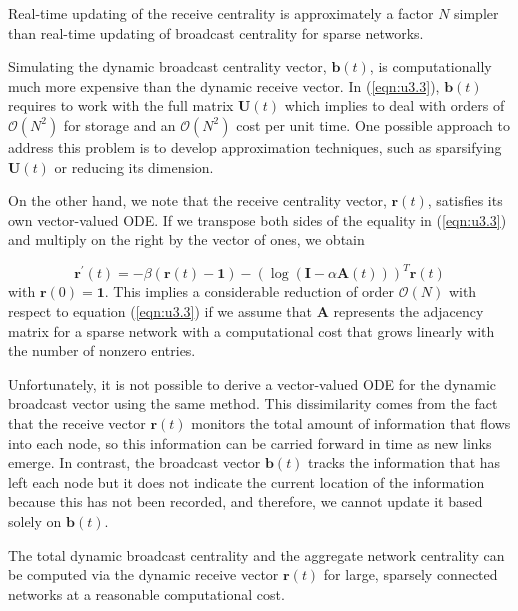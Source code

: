 \begin{highlightedParagraphC}
 
Real-time updating of the receive centrality is approximately a factor $N$ simpler than real-time updating of broadcast centrality for sparse networks.

\end{highlightedParagraphC}

Simulating the dynamic broadcast centrality vector, $\mathbf{b}(t)$, is computationally much more expensive than the dynamic receive vector. In (\ref{eqn:u3.3}), $\mathbf{b}(t)$ requires to work with the full matrix $\mathbf{U}(t)$ which implies to deal with orders of $\mathcal{O}(N^2)$ for storage and an $\mathcal{O}(N^2)$ cost per unit time. One possible approach to address this problem is to develop approximation techniques, such as sparsifying $\mathbf{U}(t)$ or reducing its dimension.

On the other hand, we note that the receive centrality vector, $\mathbf{r}(t)$, satisfies its own vector-valued ODE. If we transpose both sides of the equality in (\ref{eqn:u3.3}) and multiply on the right by the vector of ones, we obtain

\begin{equation}
\label{eqn:u4.1}
    \mathbf{r^{\prime}}(t) = -\beta (\mathbf{r}(t) - \mathbf{1}) - (\log (\mathbf{I} - \alpha \mathbf{A}(t)))^T\mathbf{r}(t)
\end{equation} with $\mathbf{r}(0)=\mathbf{1}$. This implies a considerable reduction of order $\mathcal{O}(N)$ with respect to equation (\ref{eqn:u3.3}) if we assume that $\mathbf{A}$ represents the adjacency matrix for a sparse network with a computational cost that grows linearly with the number of nonzero entries.

Unfortunately, it is not possible to derive a vector-valued ODE for the dynamic broadcast vector using the same method. This dissimilarity comes from the fact that the receive vector $\mathbf{r}(t)$ monitors the total amount of information that flows into each node, so this information can be carried forward in time as new links emerge. In contrast, the broadcast vector $\mathbf{b}(t)$ tracks the information that has left each node but it does not indicate the current location of the information because this has not been recorded, and therefore, we cannot update it based solely on $\mathbf{b}(t)$. 

\begin{highlightedParagraphC}
 
The total dynamic broadcast centrality and the aggregate network centrality can be computed via the dynamic receive vector $\mathbf{r}(t)$ for large, sparsely connected networks at a reasonable computational cost.

\end{highlightedParagraphC}

